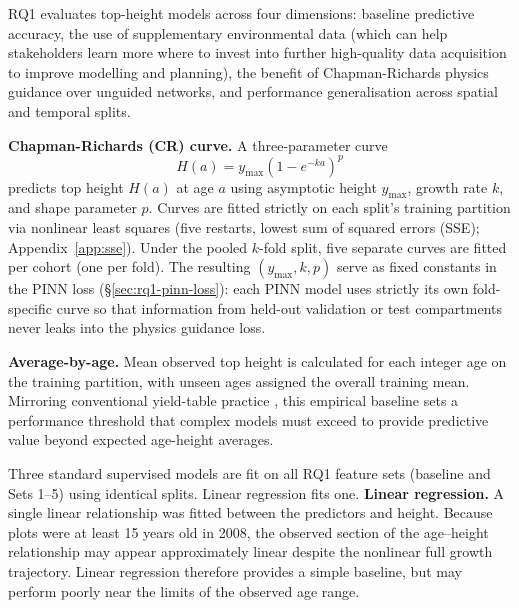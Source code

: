 \documentclass[11pt,a4paper]{report}
\begin{document}
RQ1 evaluates top-height models across four dimensions: baseline predictive accuracy, the use of supplementary environmental data (which can help stakeholders learn more where to invest into further high-quality data acquisition to improve modelling and planning), the benefit of Chapman-Richards physics guidance over unguided networks, and performance generalisation across spatial and temporal splits.

\textbf{Chapman-Richards (CR) curve.} A three-parameter curve
\begin{equation}
H(a) = y_{\max}\left(1-e^{-ka}\right)^{p}
\label{eq:cr}
\end{equation}
predicts top height $H(a)$ at age $a$ using asymptotic height $y_{\max}$, growth rate $k$, and shape parameter $p$. Curves are fitted strictly on each split's training partition via nonlinear least squares (five restarts, lowest sum of squared errors (SSE); Appendix~\ref{app:sse}). Under the pooled $k$-fold split, five separate curves are fitted per cohort (one per fold). The resulting $(y_{\max}, k, p)$ serve as fixed constants in the PINN loss (\S\ref{sec:rq1-pinn-loss}): each PINN model uses strictly its own fold-specific curve so that information from held-out validation or test compartments never leaks into the physics guidance loss.

\textbf{Average-by-age.} Mean observed top height is calculated for each integer age on the training partition, with unseen ages assigned the overall training mean. Mirroring conventional yield-table practice \citep{forestResearchForestYield}, this empirical baseline sets a performance threshold that complex models must exceed to provide predictive value beyond expected age-height averages.

Three standard supervised models are fit on all RQ1 feature sets (baseline and Sets 1–5) using identical splits. Linear regression fits one. 
\textbf{Linear regression.} A single linear relationship was fitted between the predictors and height. Because plots were at least 15 years old in 2008, the observed section of the age--height relationship may appear approximately linear despite the nonlinear full growth trajectory. Linear regression therefore provides a simple baseline, but may perform poorly near the limits of the observed age range. 
\end{document}
